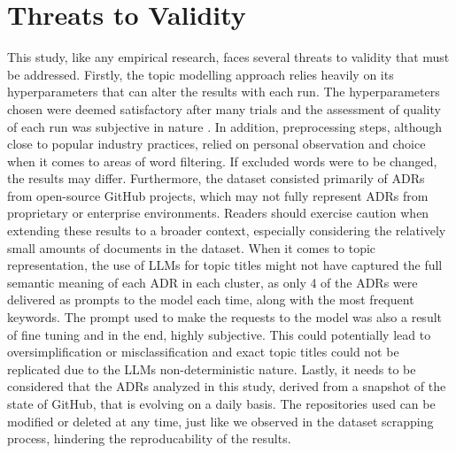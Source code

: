     \section{Threats to Validity}
    This study, like any empirical research, faces several threats to validity that must be addressed. Firstly, the topic modelling approach relies heavily on its hyperparameters that can alter the results with each run. The hyperparameters chosen were deemed satisfactory after many trials and the assessment of quality of each run was subjective in nature \cite{subjective_topic_modelling}. In addition, preprocessing steps, although close to popular industry practices, relied on personal observation and choice when it comes to areas of word filtering. If excluded words were to be changed, the results may differ. Furthermore, the dataset consisted primarily of ADRs from open-source GitHub projects, which may not fully represent ADRs from proprietary or enterprise environments. Readers should exercise caution when extending these results to a broader context, especially considering the relatively small amounts of documents in the dataset. When it comes to topic representation, the use of LLMs for topic titles might not have captured the full semantic meaning of each ADR in each cluster, as only 4 of the ADRs were delivered as prompts to the model each time, along with the most frequent keywords. The prompt used to make the requests to the model was also a result of fine tuning and in the end, highly subjective. This could potentially lead to oversimplification or misclassification and exact topic titles could not be replicated due to the LLMs non-deterministic nature. Lastly, it needs to be considered that the ADRs analyzed in this study, derived from a snapshot of the state of GitHub, that is evolving on a daily basis. The repositories used can be modified or deleted at any time, just like we observed in the dataset scrapping process, hindering the reproducability of the results.